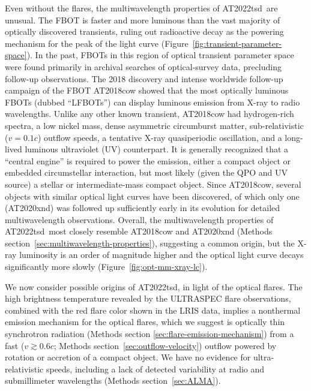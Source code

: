 \documentclass{nature_plusfigure}
\newcommand{\at}{AT2022tsd}
\begin{document}
Even without the flares, the multiwavelength properties of \at\ are unusual. The FBOT is faster and more luminous than the vast majority of optically discovered transients, ruling out radioactive decay as the powering mechanism for the peak of the light curve (Figure~\ref{fig:transient-parameter-space}). In the past, FBOTs in this region of optical transient parameter space were found primarily in archival searches of optical-survey data\cite{Drout2014,Arcavi2016,Pursiainen2018,Ho2022_RET}, precluding follow-up observations. The 2018 discovery\cite{Prentice2018} and intense worldwide follow-up campaign of the FBOT AT2018cow showed that the most optically luminous FBOTs (dubbed ``LFBOTs'')\cite{Metzger2022} can display luminous emission from X-ray to radio wavelengths\cite{RiveraSandoval2018,Margutti2019,Ho2019}. Unlike any other known transient, AT2018cow had hydrogen-rich spectra\cite{Perley2019}, a low nickel mass\cite{Perley2019}, dense\cite{Ho2019} asymmetric\cite{Margutti2019,Maund2023} circumburst matter, sub-relativistic ($v=0.1c$)\cite{Ho2019} outflow speeds, a tentative X-ray quasiperiodic oscillation\cite{Pasham2021,Zhang2022}, and a long-lived luminous ultraviolet (UV) counterpart\cite{Sun2023}. It is generally recognized that a ``central engine'' is required to power the emission, either a compact object\cite{Prentice2018,Perley2019,Margutti2019,Ho2019} or embedded circumstellar interaction\cite{Margutti2019}, but most likely (given the QPO and UV source) a stellar\cite{Margutti2019,Pasham2021} or intermediate-mass\cite{Kuin2019,Perley2019,Zhang2022,Chen2023} compact object. 
Since AT2018cow, several objects with similar optical light curves have been discovered\cite{Coppejans2020,Ho2020_Koala,Perley2021,Yao2022}, of which only one (AT2020xnd\cite{Perley2021}) was followed up sufficiently early in its evolution for detailed multiwavelength observations\cite{Bright2022,Ho2022_AT2020xnd}. Overall, the multiwavelength properties of \at\ most closely resemble AT2018cow and AT2020xnd (Methods section~\ref{sec:multiwavelength-properties}), suggesting a common origin, but the X-ray luminosity is an order of magnitude higher and the optical light curve decays significantly more slowly (Figure~\ref{fig:opt-mm-xray-lc}).

We now consider possible origins of \at, in light of the optical flares. The high brightness temperature revealed by the ULTRASPEC flare observations, combined with the red flare color shown in the LRIS data, implies a nonthermal emission mechanism for the optical flares, which we suggest is optically thin synchrotron radiation (Methods section \ref{sec:flare-emission-mechanism}) from a fast ($v\gtrsim0.6c$; Methods section~\ref{sec:outflow-velocity}) outflow powered by rotation or accretion of a compact object.
We have no evidence for ultra-relativistic speeds, including a lack of detected variability at radio and submillimeter wavelengths (Methods section~\ref{sec:ALMA}).
\end{document}

